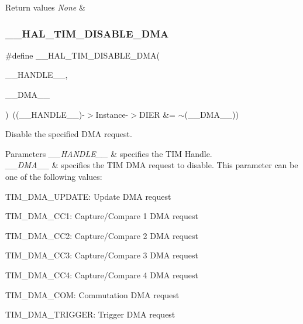 \begin{DoxyRetVals}{Return values}
{\em None} & \\
\hline
\end{DoxyRetVals}
\mbox{\label{group___t_i_m___exported___macros_ga1a6e8b19efd23fd0295802d904c4702f}} 
\subsubsection{\texorpdfstring{\+\_\+\+\_\+\+H\+A\+L\+\_\+\+T\+I\+M\+\_\+\+D\+I\+S\+A\+B\+L\+E\+\_\+\+D\+MA}{\_\_HAL\_TIM\_DISABLE\_DMA}}
{\footnotesize\ttfamily \#define \+\_\+\+\_\+\+H\+A\+L\+\_\+\+T\+I\+M\+\_\+\+D\+I\+S\+A\+B\+L\+E\+\_\+\+D\+MA(\begin{DoxyParamCaption}\item[{}]{\+\_\+\+\_\+\+H\+A\+N\+D\+L\+E\+\_\+\+\_\+,  }\item[{}]{\+\_\+\+\_\+\+D\+M\+A\+\_\+\+\_\+ }\end{DoxyParamCaption})~((\+\_\+\+\_\+\+H\+A\+N\+D\+L\+E\+\_\+\+\_\+)-\/$>$Instance-\/$>$D\+I\+ER \&= $\sim$(\+\_\+\+\_\+\+D\+M\+A\+\_\+\+\_\+))}



Disable the specified D\+MA request. 


\begin{DoxyParams}{Parameters}
{\em \+\_\+\+\_\+\+H\+A\+N\+D\+L\+E\+\_\+\+\_\+} & specifies the T\+IM Handle. \\
\hline
{\em \+\_\+\+\_\+\+D\+M\+A\+\_\+\+\_\+} & specifies the T\+IM D\+MA request to disable. This parameter can be one of the following values\+: \begin{DoxyItemize}
\item T\+I\+M\+\_\+\+D\+M\+A\+\_\+\+U\+P\+D\+A\+TE\+: Update D\+MA request \item T\+I\+M\+\_\+\+D\+M\+A\+\_\+\+C\+C1\+: Capture/\+Compare 1 D\+MA request \item T\+I\+M\+\_\+\+D\+M\+A\+\_\+\+C\+C2\+: Capture/\+Compare 2 D\+MA request \item T\+I\+M\+\_\+\+D\+M\+A\+\_\+\+C\+C3\+: Capture/\+Compare 3 D\+MA request \item T\+I\+M\+\_\+\+D\+M\+A\+\_\+\+C\+C4\+: Capture/\+Compare 4 D\+MA request \item T\+I\+M\+\_\+\+D\+M\+A\+\_\+\+C\+OM\+: Commutation D\+MA request \item T\+I\+M\+\_\+\+D\+M\+A\+\_\+\+T\+R\+I\+G\+G\+ER\+: Trigger D\+MA request \end{DoxyItemize}
\\
\hline
\end{DoxyParams}

